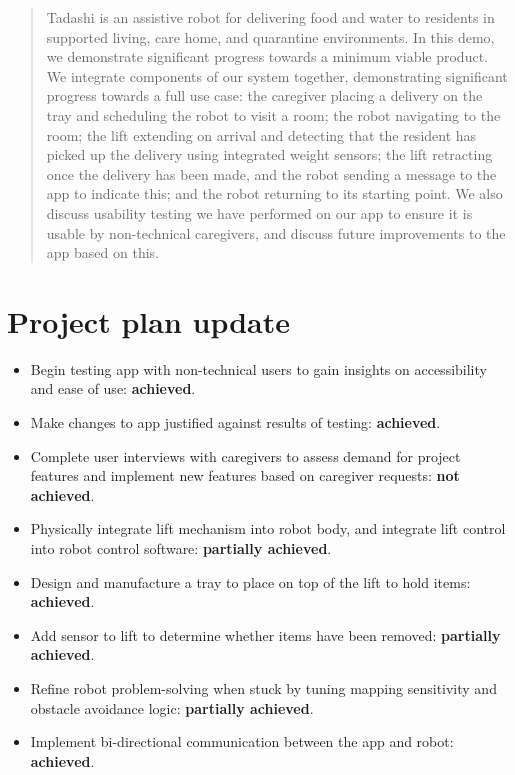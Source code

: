 \documentclass{article}
\begin{document}
 



\begin{abstract}
  Tadashi is an assistive robot for delivering food and water to residents in supported living, care home, and quarantine environments.
  In this demo, we demonstrate significant progress towards a minimum viable product. We integrate components of our system together, demonstrating significant progress towards a full use case: the caregiver placing a delivery on the tray and scheduling the robot to visit a room; the robot navigating to the room; the lift extending on arrival and detecting that the resident has picked up the delivery using integrated weight sensors; the lift retracting once the delivery has been made, and the robot sending a message to the app to indicate this; and the robot returning to its starting point. We also discuss usability testing we have performed on our app to ensure it is usable by non-technical caregivers, and discuss future improvements to the app based on this. 
\end{abstract} 

\section{Project plan update} 
\begin{itemize}
\item Begin testing app with non-technical users to gain insights on accessibility and ease of use: {\bf achieved}.
\item Make changes to app justified against results of testing: {\bf achieved}.
\item Complete user interviews with caregivers to assess demand for project features and implement new features based on caregiver requests: {\bf not achieved}.
\item Physically integrate lift mechanism into robot body, and integrate lift control into robot control software: {\bf partially achieved}.
\item Design and manufacture a tray to place on top of the lift to hold items: {\bf achieved}.
\item Add sensor to lift to determine whether items have been removed: {\bf partially achieved}.
\item Refine robot problem-solving when stuck by tuning mapping sensitivity and obstacle avoidance logic: {\bf partially achieved}. 
\item Implement bi-directional communication between the app and robot: {\bf achieved}.
\end{itemize}
\end{document}
